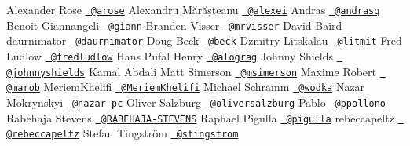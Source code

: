Alexander Rose \href{https://github.com/arose}{\texttt{ @arose}} Alexandru Mărășteanu \href{https://github.com/alexei}{\texttt{ @alexei}} Andras \href{https://github.com/andrasq}{\texttt{ @andrasq}} Benoit Giannangeli \href{https://github.com/giann}{\texttt{ @giann}} Branden Visser \href{https://github.com/mrvisser}{\texttt{ @mrvisser}} David Baird daurnimator \href{https://github.com/daurnimator}{\texttt{ @daurnimator}} Doug Beck \href{https://github.com/beck}{\texttt{ @beck}} Dzmitry Litskalau \href{https://github.com/litmit}{\texttt{ @litmit}} Fred Ludlow \href{https://github.com/fredludlow}{\texttt{ @fredludlow}} Hans Pufal Henry \href{https://github.com/alograg}{\texttt{ @alograg}} Johnny Shields \href{https://github.com/johnnyshields}{\texttt{ @johnnyshields}} Kamal Abdali Matt Simerson \href{https://github.com/msimerson}{\texttt{ @msimerson}} Maxime Robert \href{https://github.com/marob}{\texttt{ @marob}} Meriem\+Khelifi \href{https://github.com/MeriemKhelifi}{\texttt{ @\+Meriem\+Khelifi}} Michael Schramm \href{https://github.com/wodka}{\texttt{ @wodka}} Nazar Mokrynskyi \href{https://github.com/nazar-pc}{\texttt{ @nazar-\/pc}} Oliver Salzburg \href{https://github.com/oliversalzburg}{\texttt{ @oliversalzburg}} Pablo \href{https://github.com/ppollono}{\texttt{ @ppollono}} Rabehaja Stevens \href{https://github.com/RABEHAJA-STEVENS}{\texttt{ @\+RABEHAJA-\/STEVENS}} Raphael Pigulla \href{https://github.com/pigulla}{\texttt{ @pigulla}} rebeccapeltz \href{https://github.com/rebeccapeltz}{\texttt{ @rebeccapeltz}} Stefan Tingström \href{https://github.com/stingstrom}{\texttt{ @stingstrom}} 
